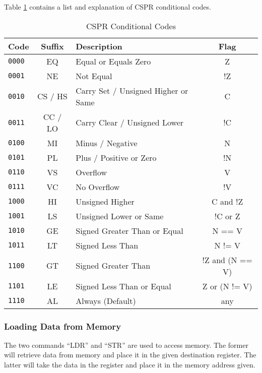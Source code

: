				Table \ref{tab:CSPRConditionCodes} contains a list and explanation of CSPR conditional codes. 
				\begin{table}[htb]
					\centering
					\begin{adjustbox}{max width=1\textwidth}
					\begin{tabular}{|l|c|l|c|}
						\hline
						\textbf{Code} & \textbf{Suffix} & \textbf{Description} & \textbf{Flag} \\ \hline
						\texttt{0000} & EQ & Equal or Equals Zero & Z \\ \hline
						\texttt{0001} & NE & Not Equal & !Z \\ \hline
						\texttt{0010} & CS / HS & Carry Set / Unsigned Higher or Same & C \\ \hline
						\texttt{0011} & CC / LO & Carry Clear / Unsigned Lower & !C \\ \hline
						\texttt{0100} & MI & Minus / Negative & N \\ \hline
						\texttt{0101} & PL & Plus / Positive or Zero & !N \\ \hline
						\texttt{0110} & VS & Overflow & V \\ \hline
						\texttt{0111} & VC & No Overflow & !V \\ \hline
						\texttt{1000} & HI & Unsigned Higher & C and !Z  \\ \hline
						\texttt{1001} & LS & Unsigned Lower or Same & !C or Z \\ \hline
						\texttt{1010} & GE & Signed Greater Than or Equal & N == V \\ \hline 
						\texttt{1011} & LT & Signed Less Than & N != V \\ \hline
						\texttt{1100} & GT & Signed Greater Than & !Z and (N == V) \\ \hline
						\texttt{1101} & LE & Signed Less Than or Equal & Z or (N != V) \\ \hline
						\texttt{1110} & AL & Always (Default) & any \\ \hline
					\end{tabular}
					\end{adjustbox}
					\caption{CSPR Conditional Codes}
					\label{tab:CSPRConditionCodes}
				\end{table}


			\subsubsection{Loading Data from Memory}
				The two commands ``LDR'' and ``STR'' are used to access memory. 
				The former will retrieve data from memory and place it in the given destination register. 
				The latter will take the data in the register and place it in the memory address given. 

